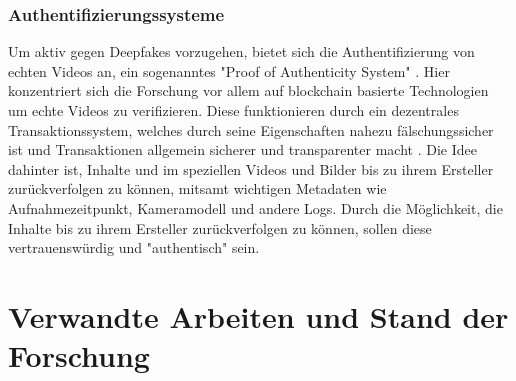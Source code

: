 \subsubsection{Authentifizierungssysteme}
Um aktiv gegen Deepfakes vorzugehen, bietet sich die Authentifizierung von echten Videos an, 
ein sogenanntes "Proof of Authenticity System" \cite{gambinDeepfakesCurrentFuture2024}. 
Hier konzentriert sich die Forschung vor allem auf blockchain basierte Technologien um echte Videos zu verifizieren. 
Diese funktionieren durch ein dezentrales Transaktionssystem, 
welches durch seine Eigenschaften nahezu fälschungssicher ist und Transaktionen allgemein sicherer und transparenter macht \cite{gambinDeepfakesCurrentFuture2024}. 
Die Idee dahinter ist, Inhalte und im speziellen Videos und Bilder bis zu ihrem Ersteller zurückverfolgen zu können, 
mitsamt wichtigen Metadaten wie Aufnahmezeitpunkt, Kameramodell und andere Logs. 
Durch die Möglichkeit, die Inhalte bis zu ihrem Ersteller zurückverfolgen zu können, sollen diese vertrauenswürdig und "authentisch" sein.
\section{Verwandte Arbeiten und Stand der Forschung}

